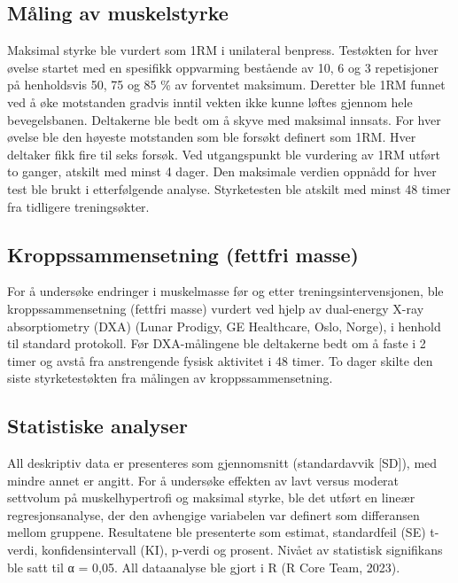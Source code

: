 \documentclass[
  letterpaper,
  DIV=11,
  numbers=noendperiod]{scrreprt}
\begin{document}
\hypertarget{muxe5ling-av-muskelstyrke}{%
\subsection{Måling av muskelstyrke}\label{muxe5ling-av-muskelstyrke}}

Maksimal styrke ble vurdert som 1RM i unilateral benpress. Testøkten for
hver øvelse startet med en spesifikk oppvarming bestående av 10, 6 og 3
repetisjoner på henholdsvis 50, 75 og 85 \% av forventet maksimum.
Deretter ble 1RM funnet ved å øke motstanden gradvis inntil vekten ikke
kunne løftes gjennom hele bevegelsbanen. Deltakerne ble bedt om å skyve
med maksimal innsats. For hver øvelse ble den høyeste motstanden som ble
forsøkt definert som 1RM. Hver deltaker fikk fire til seks forsøk. Ved
utgangspunkt ble vurdering av 1RM utført to ganger, atskilt med minst 4
dager. Den maksimale verdien oppnådd for hver test ble brukt i
etterfølgende analyse. Styrketesten ble atskilt med minst 48 timer fra
tidligere treningsøkter.

\hypertarget{kroppssammensetning-fettfri-masse}{%
\subsection{Kroppssammensetning (fettfri
masse)}\label{kroppssammensetning-fettfri-masse}}

For å undersøke endringer i muskelmasse før og etter
treningsintervensjonen, ble kroppssammensetning (fettfri masse) vurdert
ved hjelp av dual-energy X-ray absorptiometry (DXA) (Lunar Prodigy, GE
Healthcare, Oslo, Norge), i henhold til standard protokoll. Før
DXA-målingene ble deltakerne bedt om å faste i 2 timer og avstå fra
anstrengende fysisk aktivitet i 48 timer. To dager skilte den siste
styrketestøkten fra målingen av kroppssammensetning.

\hypertarget{statistiske-analyser-3}{%
\subsection{Statistiske analyser}\label{statistiske-analyser-3}}

All deskriptiv data er presenteres som gjennomsnitt (standardavvik
{[}SD{]}), med mindre annet er angitt. For å undersøke effekten av lavt
versus moderat settvolum på muskelhypertrofi og maksimal styrke, ble det
utført en lineær regresjonsanalyse, der den avhengige variabelen var
definert som differansen mellom gruppene. Resultatene ble presenterte
som estimat, standardfeil (SE) t-verdi, konfidensintervall (KI), p-verdi
og prosent. Nivået av statistisk signifikans ble satt til α = 0,05. All
dataanalyse ble gjort i R (R Core Team, 2023).
\end{document}
